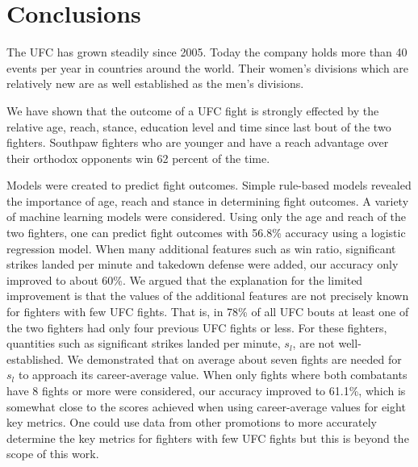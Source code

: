\clearpage
\section{Conclusions}

The UFC has grown steadily since 2005. Today the company holds
more than 40 events per year in countries around the world. Their
women's divisions which are relatively new are as well established
as the men's divisions.

We have shown that the outcome of a UFC fight is strongly effected
by the relative age, reach,
stance, education level and time since last bout of the two fighters.
Southpaw fighters who are younger and have a reach advantage over their
orthodox opponents win 62 percent of the time.

Models were created to predict fight outcomes. Simple rule-based models
revealed the importance of
age, reach and stance in determining fight outcomes.
A variety of machine learning models were considered.
Using only the age and reach of the two fighters, one can predict
fight outcomes with
56.8\% accuracy using a logistic regression model. When many additional
features such as win ratio,
significant strikes landed per minute and takedown defense were
added, our accuracy only improved to about 60\%.
We argued that the explanation
for the limited improvement is that the values
of the additional features are not precisely known for fighters
with few UFC fights. That is,
in 78\% of all UFC bouts at least one of the two fighters
had only four previous UFC fights or less. For these 
fighters, quantities such
as significant strikes landed per minute, $s_l$, are not well-established.
We demonstrated that on average about seven fights
are needed for $s_l$ to approach its career-average value. When
only fights where both combatants have 8 fights or more were
considered, our accuracy improved to 61.1\%, which is somewhat
close to the scores achieved when using career-average values
for eight key metrics. One could use data from other
promotions to more accurately determine the
key metrics for fighters with few UFC fights but
this is beyond the scope of this work.

